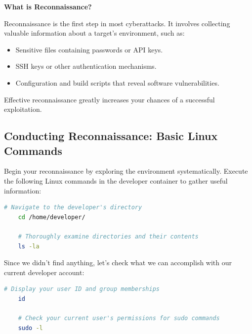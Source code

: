 \documentclass[12pt]{scrartcl}
\newenvironment{hintbox}{%
    \def\FrameCommand{\fboxsep=\FrameSep\colorbox{hintgreen!20}}%
    \MakeFramed {\advance\hsize-\width \FrameRestore}}%
    {\endMakeFramed}
\begin{document}
    \begin{hintbox}
    \noindent
    \textbf{What is Reconnaissance?}

    Reconnaissance is the first step in most cyberattacks. It involves collecting valuable information about a target's environment, such as:

    \begin{itemize}[itemsep=0.5em]
        \item Sensitive files containing passwords or API keys.
        \item SSH keys or other authentication mechanisms.
        \item Configuration and build scripts that reveal software vulnerabilities.
    \end{itemize}

    Effective reconnaissance greatly increases your chances of a successful exploitation.
    \end{hintbox}

    \subsection{Conducting Reconnaissance: Basic Linux Commands}

    Begin your reconnaissance by exploring the environment systematically. Execute the following Linux commands in the developer container to gather useful information:

    \begin{lstlisting}[language=bash, caption=Advanced exploration commands]
    # Navigate to the developer's directory
    cd /home/developer/

    # Thoroughly examine directories and their contents
    ls -la

    \end{lstlisting}

    \vspace{1em}

    \newpage

    Since we didn't find anything, let's check what we can accomplish with our current developer account:

    \begin{lstlisting}[language=bash, caption=Checking user privileges]
    # Display your user ID and group memberships
    id

    # Check your current user's permissions for sudo commands
    sudo -l
    \end{lstlisting}
\end{document}
